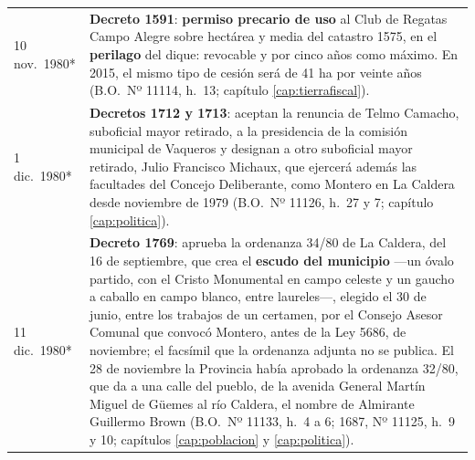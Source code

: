 \begin{longtable}{@{}p{2.7cm}p{10.3cm}@{}}
10 nov.\ 1980* & \textbf{Decreto 1591}: \textbf{permiso precario de uso} al Club de Regatas Campo Alegre sobre hectárea y media del catastro 1575, en el \textbf{perilago} del dique: revocable y por cinco años como máximo. En 2015, el mismo tipo de cesión será de 41 ha por veinte años (B.O.\ Nº 11114, h.\ 13; capítulo \ref{cap:tierrafiscal}). \\
1 dic.\ 1980* & \textbf{Decretos 1712 y 1713}: aceptan la renuncia de Telmo Camacho, suboficial mayor retirado, a la presidencia de la comisión municipal de Vaqueros y designan a otro suboficial mayor retirado, Julio Francisco Michaux, que ejercerá además las facultades del Concejo Deliberante, como Montero en La Caldera desde noviembre de 1979 (B.O.\ Nº 11126, h.\ 27 y 7; capítulo \ref{cap:politica}). \\
11 dic.\ 1980* & \textbf{Decreto 1769}: aprueba la ordenanza 34/80 de La Caldera, del 16 de septiembre, que crea el \textbf{escudo del municipio} ---un óvalo partido, con el Cristo Monumental en campo celeste y un gaucho a caballo en campo blanco, entre laureles---, elegido el 30 de junio, entre los trabajos de un certamen, por el Consejo Asesor Comunal que convocó Montero, antes de la Ley 5686, de noviembre; el facsímil que la ordenanza adjunta no se publica. El 28 de noviembre la Provincia había aprobado la ordenanza 32/80, que da a una calle del pueblo, de la avenida General Martín Miguel de Güemes al río Caldera, el nombre de Almirante Guillermo Brown (B.O.\ Nº 11133, h.\ 4 a 6; 1687, Nº 11125, h.\ 9 y 10; capítulos \ref{cap:poblacion} y \ref{cap:politica}). \\

\end{longtable}

